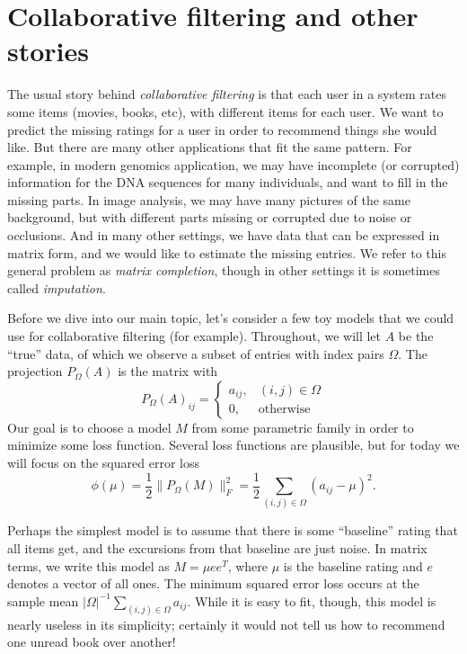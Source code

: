 \documentclass[12pt, leqno]{article} %
\begin{document}

\section{Collaborative filtering and other stories}

The usual story behind {\em collaborative filtering} is that each user
in a system rates some items (movies, books, etc), with different
items for each user.  We want to predict the missing ratings for a
user in order to recommend things she would like.  But there are many
other applications that fit the same pattern.  For example,
in modern genomics application, we may have incomplete (or corrupted)
information for the DNA sequences for many individuals, and want to
fill in the missing parts.  In image analysis, we may have many
pictures of the same background, but with different parts missing or
corrupted due to noise or occlusions.  And in many other settings,
we have data that can be expressed in matrix form, and we would like
to estimate the missing entries.  We refer to this general problem
as {\em matrix completion}, though in other settings it is sometimes
called {\em imputation}.

Before we dive into our main topic, let's consider a few toy models
that we could use for collaborative filtering (for example).
Throughout, we will let $A$ be the ``true'' data, of which
we observe a subset of entries with index pairs $\Omega$.
The projection $P_{\Omega}(A)$ is the matrix with
\[
  P_{\Omega}(A)_{ij} =
  \begin{cases}
    a_{ij}, & (i,j) \in \Omega \\
    0, & \mbox{otherwise}
  \end{cases}
\]
Our goal is to choose a model $M$ from some parametric family
in order to minimize some loss function.  Several loss functions are
plausible, but for today we will focus on the squared error loss
\[
  \phi(\mu)
  = \frac{1}{2} \|P_{\Omega}(M)\|_F^2
  = \frac{1}{2} \sum_{(i,j) \in \Omega} (a_{ij}-\mu)^2.
\]

Perhaps the simplest model is to assume that there is some
``baseline'' rating that all items get, and the excursions from that
baseline are just noise.  In matrix terms, we write this model as
$M = \mu ee^T$, where $\mu$ is the baseline rating and $e$
denotes a vector of all ones.  The minimum squared error loss occurs
at the sample mean $|\Omega|^{-1} \sum_{(i,j) \in \Omega} a_{ij}$.
While it is easy to fit, though, this model is nearly useless in its
simplicity; certainly it would not tell us how to recommend one unread
book over another!
\end{document}
